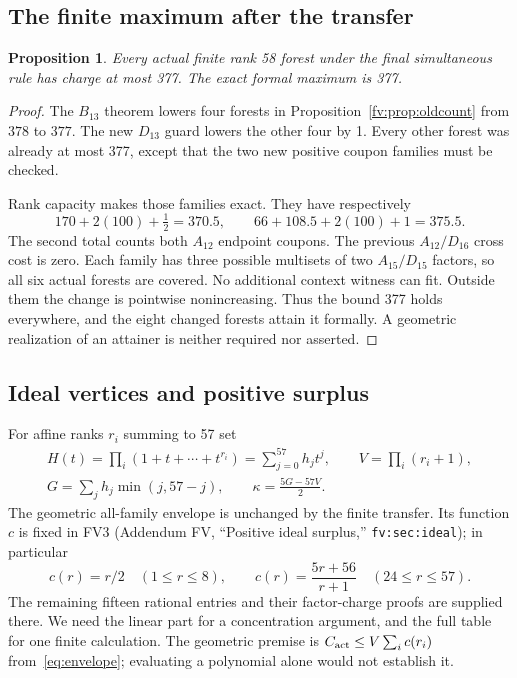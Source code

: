 \documentclass[11pt]{article}
\newtheorem{proposition}[theorem]{Proposition}
\theoremstyle{remark}\newtheorem{remark}[theorem]{Remark}
\numberwithin{equation}{section}
\begin{document}
\subsection{The finite maximum after the transfer}
\begin{proposition}\label{prop:local}Every actual finite rank 58 forest under the final simultaneous rule has
charge at most 377. The exact formal maximum is 377.
\end{proposition}
\begin{proof}
The $B_{13}$ theorem lowers four forests in Proposition~\ref{fv:prop:oldcount}
from $378$ to $377$. The new $D_{13}$ guard lowers the other four by 1. Every
other forest was already at most 377, except that the two new positive
coupon families must be checked.

Rank capacity makes those families exact. They have respectively
 \[
 170+2(100)+\tfrac12=370.5,
 \qquad66+108.5+2(100)+1=375.5.
\]
The second total counts both $A_{12}$ endpoint coupons. The previous
 $A_{12}/D_{16}$ cross cost is zero. Each family has three possible
multisets of two $A_{15}/D_{15}$ factors, so all six actual forests are
covered. No additional context witness can fit. Outside them the change
is pointwise nonincreasing. Thus the bound 377 holds everywhere, and the
eight changed forests attain it formally. A geometric realization of an
attainer is neither required nor asserted.
\end{proof}


\subsection{Ideal vertices and positive surplus}\label{fv:sec:ideal}
For affine ranks $r_i$ summing to 57 set
 \[
 \begin{gathered}
 H(t)=\prod_i(1+t+\cdots+t^{r_i})=\sum_{j=0}^{57}h_jt^j,
 \qquad V=\prod_i(r_i+1),\\
 G=\sum_jh_j\min(j,57-j),\qquad\kappa=\frac{5G-57V}{2}.
 \end{gathered}
\]
The geometric all-family envelope is unchanged by the finite
transfer. Its function $c$ is fixed in FV3 (Addendum FV,
``Positive ideal surplus,'' \texttt{fv:sec:ideal}); in particular
\[
 c(r)=r/2\quad(1\le r\le8),\qquad
 c(r)=\frac{5r+56}{r+1}\quad(24\le r\le57).
\]
The remaining fifteen rational entries and their factor-charge
proofs are supplied there. We need the linear part for a
concentration argument, and the full table for one finite
calculation. The geometric premise is
$C_{\rm act}\le V\sum_i c(r_i)$ from~\eqref{eq:envelope};
evaluating a polynomial alone would not establish it.
\end{document}
